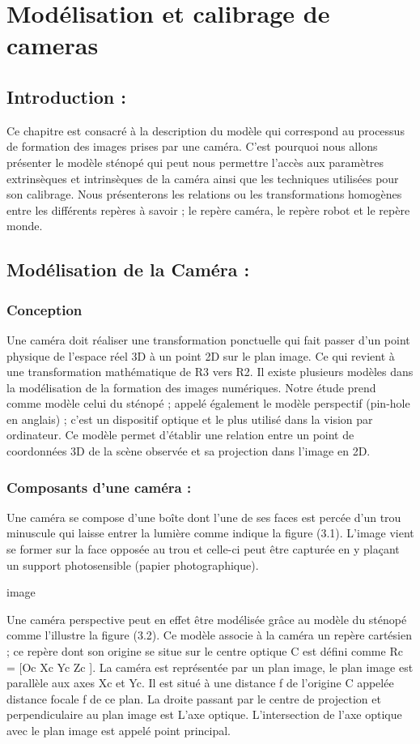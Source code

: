 \chapter{Modélisation et calibrage de cameras}
\section{Introduction :}
Ce chapitre est consacré à la description du modèle qui correspond au processus de 
formation des images prises par une caméra. C'est pourquoi nous allons présenter le modèle 
sténopé qui peut nous permettre l'accès aux paramètres extrinsèques et intrinsèques de la 
caméra ainsi que les techniques utilisées pour son calibrage. Nous présenterons les relations 
ou les transformations homogènes entre les différents repères à savoir ; le repère caméra, le 
repère robot et le repère monde.
\section{Modélisation de la Caméra :}
\subsection{Conception}
Une caméra doit réaliser une transformation ponctuelle qui fait passer d’un point 
physique de l’espace réel 3D à un point 2D sur le plan image. Ce qui revient à une 
transformation mathématique de R3 vers R2.
Il existe plusieurs modèles dans la modélisation de la formation des images numériques. 
Notre étude prend comme modèle celui du sténopé ; appelé également le modèle perspectif 
(pin-hole en anglais) ; c'est un dispositif optique et le plus utilisé dans la vision par ordinateur. 
Ce modèle permet d'établir une relation entre un point de coordonnées 3D de la scène 
observée et sa projection dans l'image en 2D.
\subsection{ Composants d'une caméra :}
Une caméra se compose d'une boîte dont l'une de ses faces est percée d'un trou minuscule 
qui laisse entrer la lumière comme indique la figure (3.1). 
L'image vient se former sur la face opposée au trou et celle-ci peut être capturée en y 
plaçant un support photosensible (papier photographique).

image 

Une caméra perspective peut en effet être modélisée grâce au modèle du sténopé comme 
l'illustre la figure (3.2). Ce modèle associe à la caméra un repère cartésien ; ce repère dont son 
origine se situe sur le centre optique C est défini comme Rc = [Oc Xc Yc Zc ]. La caméra est 
représentée par un plan image, le plan image est parallèle aux axes Xc et Yc. Il est situé à une 
distance f de l'origine C appelée distance focale f de ce plan. La droite passant par le centre 
de projection et perpendiculaire au plan image est L'axe optique. L'intersection de l'axe 
optique avec le plan image est appelé point principal.

